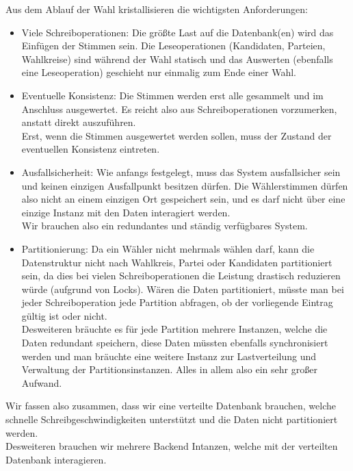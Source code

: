 \documentclass{article}  %
\begin{document}
Aus dem Ablauf der Wahl kristallisieren die wichtigsten Anforderungen: \\
\begin{itemize}
    \item Viele Schreiboperationen: Die größte Last auf die Datenbank(en) wird das Einfügen der Stimmen sein. Die Leseoperationen (Kandidaten, Parteien, Wahlkreise) sind während der Wahl statisch und das Auswerten (ebenfalls eine Leseoperation) geschieht nur einmalig zum Ende einer Wahl. 

    \item Eventuelle Konsistenz: Die Stimmen werden erst alle gesammelt und im Anschluss ausgewertet. Es reicht also aus Schreiboperationen vorzumerken, anstatt direkt auszuführen. \\ Erst, wenn die Stimmen ausgewertet werden sollen, muss der Zustand der eventuellen Konsistenz eintreten.

    \item Ausfallsicherheit: Wie anfangs festgelegt, muss das System ausfallsicher sein und keinen einzigen Ausfallpunkt besitzen dürfen. Die Wählerstimmen dürfen also nicht an einem einzigen Ort gespeichert sein, und es darf nicht über eine einzige Instanz mit den Daten interagiert werden. \\
    Wir brauchen also ein redundantes und ständig verfügbares System.


    \item Partitionierung: Da ein Wähler nicht mehrmals wählen darf, kann die Datenstruktur nicht nach Wahlkreis, Partei oder Kandidaten partitioniert sein, da dies bei vielen Schreiboperationen die Leistung drastisch reduzieren würde (aufgrund von Locks). Wären die Daten partitioniert, müsste man bei jeder Schreiboperation jede Partition abfragen, ob der vorliegende Eintrag gültig ist oder nicht. \\ Desweiteren bräuchte es für jede Partition mehrere Instanzen, welche die Daten redundant speichern, diese Daten müssten ebenfalls synchronisiert werden und man bräuchte eine weitere Instanz zur Lastverteilung und Verwaltung der Partitionsinstanzen. Alles in allem also ein sehr großer Aufwand.

 
\end{itemize} 

Wir fassen also zusammen, dass wir eine verteilte Datenbank brauchen, welche schnelle Schreibgeschwindigkeiten unterstützt und die Daten nicht partitioniert werden. \\
Desweiteren brauchen wir mehrere Backend Intanzen, welche mit der verteilten Datenbank interagieren. \\
\end{document}
